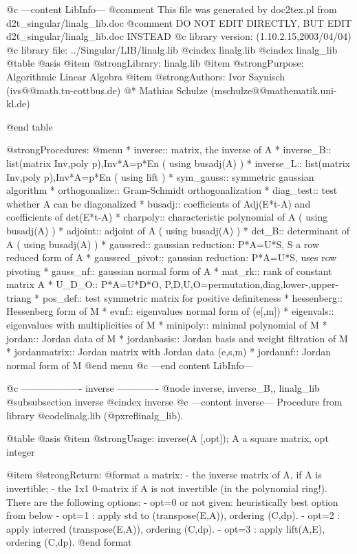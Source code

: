 @c ---content LibInfo---
@comment This file was generated by doc2tex.pl from d2t_singular/linalg_lib.doc
@comment DO NOT EDIT DIRECTLY, BUT EDIT d2t_singular/linalg_lib.doc INSTEAD
@c library version: (1.10.2.15,2003/04/04)
@c library file: ../Singular/LIB/linalg.lib
@cindex linalg.lib
@cindex linalg_lib
@table @asis
@item @strong{Library:}
linalg.lib
@item @strong{Purpose:}
  Algorithmic Linear Algebra
@item @strong{Authors:}
Ivor Saynisch (ivs@@math.tu-cottbus.de)
@* Mathias Schulze (mschulze@@mathematik.uni-kl.de)

@end table

@strong{Procedures:}
@menu
* inverse:: matrix, the inverse of A
* inverse_B:: list(matrix Inv,poly p),Inv*A=p*En ( using busadj(A) )
* inverse_L:: list(matrix Inv,poly p),Inv*A=p*En ( using lift )
* sym_gauss:: symmetric gaussian algorithm
* orthogonalize:: Gram-Schmidt orthogonalization
* diag_test:: test whether A can be diagonalized
* busadj:: coefficients of Adj(E*t-A) and coefficients of det(E*t-A)
* charpoly:: characteristic polynomial of A ( using busadj(A) )
* adjoint:: adjoint of A ( using busadj(A) )
* det_B:: determinant of A ( using busadj(A) )
* gaussred:: gaussian reduction: P*A=U*S, S a row reduced form of A
* gaussred_pivot:: gaussian reduction: P*A=U*S, uses row pivoting
* gauss_nf:: gaussian normal form of A
* mat_rk:: rank of constant matrix A
* U_D_O:: P*A=U*D*O, P,D,U,O=permutation,diag,lower-,upper-triang
* pos_def:: test symmetric matrix for positive definiteness
* hessenberg:: Hessenberg form of M
* evnf:: eigenvalues normal form of (e[,m])
* eigenvals:: eigenvalues with multiplicities of M
* minipoly:: minimal polynomial of M
* jordan:: Jordan data of M
* jordanbasis:: Jordan basis and weight filtration of M
* jordanmatrix:: Jordan matrix with Jordan data (e,s,m)
* jordannf:: Jordan normal form of M
@end menu
@c ---end content LibInfo---

@c ------------------- inverse -------------
@node inverse, inverse_B,, linalg_lib
@subsubsection inverse
@cindex inverse
@c ---content inverse---
Procedure from library @code{linalg.lib} (@pxref{linalg_lib}).

@table @asis
@item @strong{Usage:}
inverse(A [,opt]); A a square matrix, opt integer

@item @strong{Return:}
@format
          a matrix:
          - the inverse matrix of A, if A is invertible;
          - the 1x1 0-matrix if A is not invertible (in the polynomial ring!).
          There are the following options:
          - opt=0 or not given: heuristically best option from below
          - opt=1 : apply std to (transpose(E,A)), ordering (C,dp).
          - opt=2 : apply interred (transpose(E,A)), ordering (C,dp).
          - opt=3 : apply lift(A,E), ordering (C,dp).
@end format

